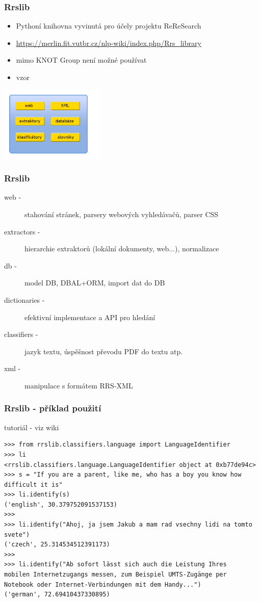 \documentclass{beamer}
\begin{document}
\begin{frame}
  \frametitle{Rrslib}
  \begin{itemize}
    \item Pythoní knihovna vyvinutá pro účely projektu ReReSearch
    \item \textcolor{blue}{\underline{\href{https://merlin.fit.vutbr.cz/nlp-wiki/index.php/Rrs\_library}{https://merlin.fit.vutbr.cz/nlp-wiki/index.php/Rrs\_library}}}
    \item mimo KNOT Group není možné používat
    \item vzor
  \end{itemize}
  \includegraphics[width=5cm]{rrslib_structure.png}
\end{frame}

\begin{frame}
  \frametitle{Rrslib}
  \begin{description}
    \item[web -] {stahování stránek, parsery webových vyhledávačů, parser CSS}
    \item[extractors -] {hierarchie extraktorů (lokální dokumenty, web...), normalizace}
    \item[db -] {model DB, DBAL+ORM, import dat do DB}
    \item[dictionaries -] {efektivní implementace a API pro hledání}
    \item[classifiers -] {jazyk textu, úspěšnost převodu PDF do textu atp.}
    \item[xml -] {manipulace s formátem RRS-XML}
  \end{description}
\end{frame}

\begin{frame}[containsverbatim]
  \frametitle{Rrslib - příklad použití}
  {tutoriál - viz wiki}
  \begingroup
  \fontsize{6,5pt}{8pt}\selectfont
  \begin{verbatim}
>>> from rrslib.classifiers.language import LanguageIdentifier
>>> li
<rrslib.classifiers.language.LanguageIdentifier object at 0xb77de94c>
>>> s = "If you are a parent, like me, who has a boy you know how difficult it is"
>>> li.identify(s)
('english', 30.379752091537153)
>>>
>>> li.identify("Ahoj, ja jsem Jakub a mam rad vsechny lidi na tomto svete")
('czech', 25.314534512391173)
>>>
>>> li.identify("Ab sofort lässt sich auch die Leistung Ihres
mobilen Internetzugangs messen, zum Beispiel UMTS-Zugänge per
Notebook oder Internet-Verbindungen mit dem Handy...")
('german', 72.69410437330895)
  \end{verbatim}
  \endgroup
\end{frame}
\end{document}
